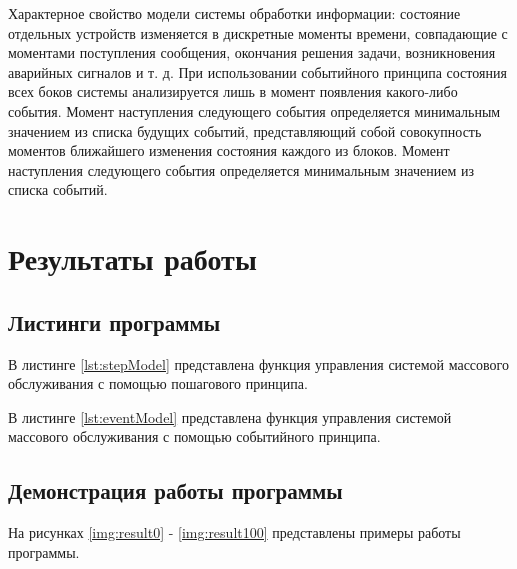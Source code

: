 \documentclass{bmstu}
\begin{document}
Характерное свойство модели системы обработки информации: состояние отдельных устройств изменяется в дискретные моменты времени, совпадающие с моментами поступления сообщения, окончания решения задачи, возникновения аварийных сигналов и т. д. При использовании событийного принципа состояния всех боков системы анализируется лишь в момент появления какого-либо события. Момент наступления следующего события определяется минимальным значением из списка будущих событий, представляющий собой совокупность моментов ближайшего изменения состояния каждого из блоков. Момент наступления следующего события определяется минимальным значением из списка событий.

\chapter{Результаты работы}

\section{Листинги программы}

В листинге \ref{lst:stepModel} представлена функция управления системой массового обслуживания с помощью пошагового принципа.


В листинге \ref{lst:eventModel} представлена функция управления системой массового обслуживания с помощью событийного принципа.


\clearpage

\section{Демонстрация работы программы}

На рисунках \ref{img:result0} - \ref{img:result100} представлены примеры работы программы.




\end{document}
